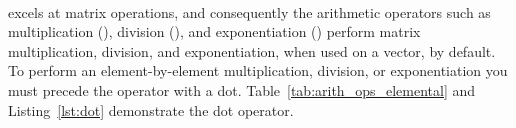 \addtolength{\parindent}{-4mm}
\\
\addtolength{\parindent}{4mm}

\mlab excels at matrix operations, and consequently the arithmetic operators such as multiplication (\mcode{*}), division (\mcode{/}), and exponentiation (\mcode{^}) perform matrix multiplication, division, and exponentiation, when used on a vector, by default. To perform an element-by-element multiplication, division, or exponentiation you must precede the operator with a dot. Table~\ref{tab:arith_ops_elemental} and Listing~\ref{lst:dot} demonstrate the dot operator.


